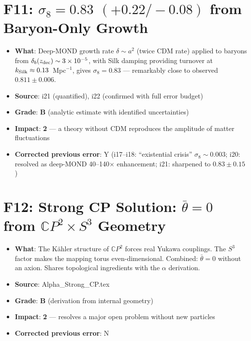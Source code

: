\documentclass[11pt,a4paper]{article}
\newcommand{\grade}[1]{\textbf{#1}}
\newcommand{\impact}[1]{\textbf{#1}}
\begin{document}
\section{F11: $\sigma_8 = 0.83$ $(+0.22/-0.08)$ from Baryon-Only Growth}
\begin{itemize}[nosep]
\item \textbf{What}: Deep-MOND growth rate $\delta \sim a^2$ (twice CDM rate) applied to baryons from $\delta_b(z_{\rm dec}) \sim 3 \times 10^{-5}$, with Silk damping providing turnover at $k_{\rm Silk} \approx 0.13$~Mpc$^{-1}$, gives $\sigma_8 = 0.83$ --- remarkably close to observed $0.811 \pm 0.006$.
\item \textbf{Source}: i21 (quantified), i22 (confirmed with full error budget)
\item \textbf{Grade}: \grade{B} (analytic estimate with identified uncertainties)
\item \textbf{Impact}: \impact{2} --- a theory without CDM reproduces the amplitude of matter fluctuations
\item \textbf{Corrected previous error}: Y (i17--i18: ``existential crisis'' $\sigma_8 \sim 0.003$; i20: resolved as deep-MOND 40--140$\times$ enhancement; i21: sharpened to $0.83 \pm 0.15$)
\end{itemize}

\section{F12: Strong CP Solution: $\bar{\theta} = 0$ from $\mathbb{C}P^2 \times S^3$ Geometry}
\begin{itemize}[nosep]
\item \textbf{What}: The K\"ahler structure of $\mathbb{C}P^2$ forces real Yukawa couplings. The $S^3$ factor makes the mapping torus even-dimensional. Combined: $\bar{\theta} = 0$ without an axion. Shares topological ingredients with the $\alpha$ derivation.
\item \textbf{Source}: Alpha\_Strong\_CP.tex
\item \textbf{Grade}: \grade{B} (derivation from internal geometry)
\item \textbf{Impact}: \impact{2} --- resolves a major open problem without new particles
\item \textbf{Corrected previous error}: N
\end{itemize}
\end{document}
